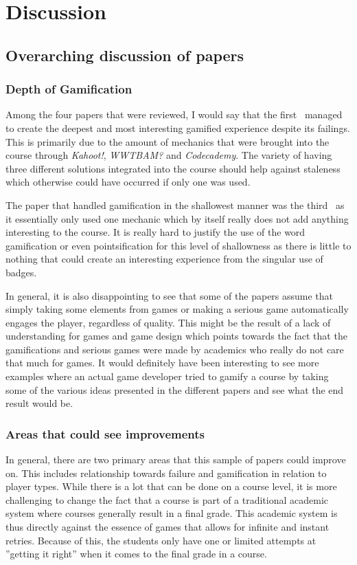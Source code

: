 \section{Discussion}

\subsection{Overarching discussion of papers}
\subsubsection{Depth of Gamification}
Among the four papers that were reviewed, I would say that the first~\cite{panagiotis2016climbing} managed to create the deepest and most interesting gamified experience despite its failings. This is primarily due to the amount of mechanics that were brought into the course through \emph{Kahoot!}, \emph{WWTBAM?} and \emph{Codecademy}. The variety of having three different solutions integrated into the course should help against staleness which otherwise could have occurred if only one was used. 

The paper that handled gamification in the shallowest manner was the third~\cite{ortiz2017gamification} as it essentially only used one mechanic which by itself really does not add anything interesting to the course. It is really hard to justify the use of the word gamification or even pointsification for this level of shallowness as there is little to nothing that could create an interesting experience from the singular use of badges. 

In general, it is also disappointing to see that some of the papers assume that simply taking some elements from games or making a serious game automatically engages the player, regardless of quality. This might be the result of a lack of understanding for games and game design which points towards the fact that the gamifications and serious games were made by academics who really do not care that much for games. It would definitely have been interesting to see more examples where an actual game developer tried to gamify a course by taking some of the various ideas presented in the different papers and see what the end result would be. 

\subsubsection{Areas that could see improvements}
In general, there are two primary areas that this sample of papers could improve on. This includes relationship towards failure and gamification in relation to player types. 
While there is a lot that can be done on a course level, it is more challenging to change the fact that a course is part of a traditional academic system where courses generally result in a final grade. This academic system is thus directly against the essence of games that allows for infinite and instant retries. Because of this, the students only have one or limited attempts at ''getting it right'' when it comes to the final grade in a course. 

